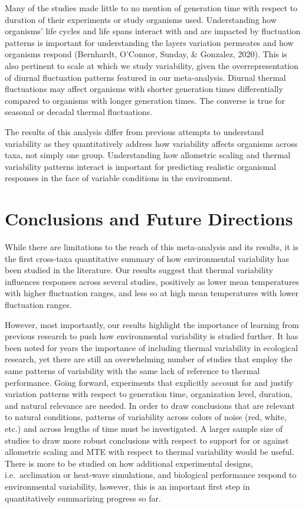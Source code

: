 \documentclass[12pt,twoside]{reedthesis}
\begin{document}
Many of the studies made little to no mention of generation time with respect to duration of their experiments or study organisms used. Understanding how organisms' life cycles and life spans interact with and are impacted by fluctuation patterns is important for understanding the layers variation permeates and how organisms respond (Bernhardt, O'Connor, Sunday, \& Gonzalez, 2020). This is also pertinent to scale at which we study variability, given the overrepresentation of diurnal fluctuation patterns featured in our meta-analysis. Diurnal thermal fluctuations may affect organisms with shorter generation times differentially compared to organisms with longer generation times. The converse is true for seasonal or decadal thermal fluctuations.

The results of this analysis differ from previous attempts to understand variability as they quantitatively address how variability affects organisms across taxa, not simply one group. Understanding how allometric scaling and thermal variability patterns interact is important for predicting realistic organismal responses in the face of variable conditions in the environment.

\hypertarget{conclusions-and-future-directions}{%
\chapter*{Conclusions and Future Directions}\label{conclusions-and-future-directions}}

While there are limitations to the reach of this meta-analysis and its results, it is the first cross-taxa quantitative summary of how environmental variability has been studied in the literature. Our results suggest that thermal variability influences responses across several studies, positively as lower mean temperatures with higher fluctuation ranges, and less so at high mean temperatures with lower fluctuation ranges.

However, most importantly, our results highlight the importance of learning from previous research to push how environmental variability is studied further. It has been noted for years the importance of including thermal variability in ecological research, yet there are still an overwhelming number of studies that employ the same patterns of variability with the same lack of reference to thermal performance. Going forward, experiments that explicitly account for and justify variation patterns with respect to generation time, organization level, duration, and natural relevance are needed. In order to draw conclusions that are relevant to natural conditions, patterns of variability across colors of noise (red, white, etc.) and across lengths of time must be investigated. A larger sample size of studies to draw more robust conclusions with respect to support for or against allometric scaling and MTE with respect to thermal variability would be useful. There is more to be studied on how additional experimental designs, i.e.~acclimation or heat-wave simulations, and biological performance respond to environmental variability, however, this is an important first step in quantitatively summarizing progress so far.
\end{document}
